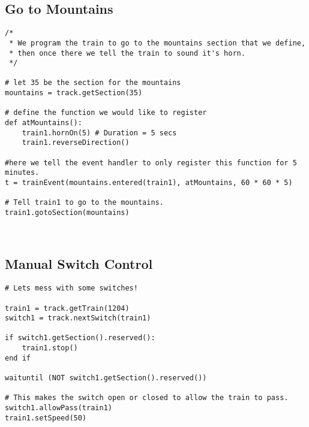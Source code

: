 \documentclass[a4paper,11pt,notitlepage]{article}
\begin{document}
\subsection{Go to Mountains}
\begin{verbatim}
/*
 * We program the train to go to the mountains section that we define,
 * then once there we tell the train to sound it's horn.
 */

# let 35 be the section for the mountains
mountains = track.getSection(35)

# define the function we would like to register
def atMountains():
	train1.hornOn(5) # Duration = 5 secs
    train1.reverseDirection()

#here we tell the event handler to only register this function for 5 minutes.
t = trainEvent(mountains.entered(train1), atMountains, 60 * 60 * 5)

# Tell train1 to go to the mountains.
train1.gotoSection(mountains)



\end{verbatim}
\subsection{Manual Switch Control}
\begin{verbatim}
# Lets mess with some switches!

train1 = track.getTrain(1204)
switch1 = track.nextSwitch(train1)

if switch1.getSection().reserved():
    train1.stop()
end if

waituntil (NOT switch1.getSection().reserved())

# This makes the switch open or closed to allow the train to pass.
switch1.allowPass(train1)
train1.setSpeed(50)
\end{verbatim}
\end{document}
